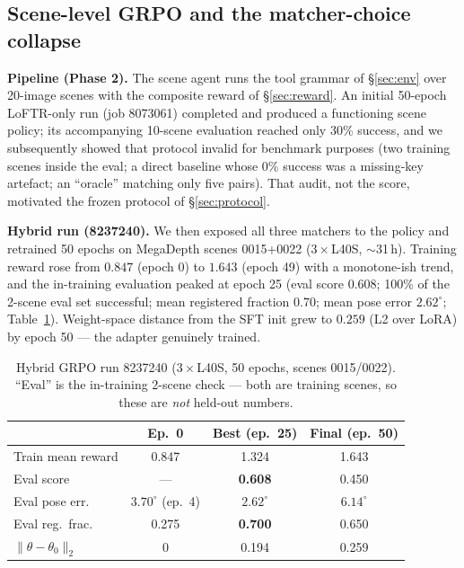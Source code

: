 \documentclass[10pt,twocolumn,letterpaper]{article}
\begin{document}
\subsection{Scene-level GRPO and the matcher-choice collapse}
\label{sec:hybrid}

\textbf{Pipeline (Phase 2).} The scene agent runs the tool grammar of
\S\ref{sec:env} over 20-image scenes with the composite reward of
\S\ref{sec:reward}. An initial 50-epoch LoFTR-only run (job 8073061)
completed and produced a functioning scene policy; its accompanying
10-scene evaluation reached only 30\% success, and we subsequently showed
that protocol invalid for benchmark purposes (two training scenes inside
the eval; a direct baseline whose 0\% success was a missing-key artefact;
an ``oracle'' matching only five pairs). That audit, not the score,
motivated the frozen protocol of \S\ref{sec:protocol}.

\textbf{Hybrid run (8237240).} We then exposed all three matchers to the
policy and retrained 50 epochs on MegaDepth scenes 0015+0022
($3\times$L40S, $\sim$31\,h). Training reward rose from
$0.847$ (epoch 0) to $1.643$ (epoch 49) with a monotone-ish trend, and the
in-training evaluation peaked at epoch 25 (eval score 0.608; 100\% of the
2-scene eval set successful; mean registered fraction 0.70; mean pose
error $2.62^\circ$; Table~\ref{tab:hybrid}). Weight-space distance from
the SFT init grew to $0.259$ (L2 over LoRA) by epoch 50 — the adapter
genuinely trained.

\begin{table}[t]
\centering\small
\caption{Hybrid GRPO run 8237240 ($3\times$L40S, 50 epochs, scenes
0015/0022). ``Eval'' is the in-training 2-scene check — both are training
scenes, so these are \emph{not} held-out numbers.}
\label{tab:hybrid}
\begin{tabular}{lccc}
\toprule
 & Ep.\ 0 & Best (ep.\ 25) & Final (ep.\ 50) \\
\midrule
Train mean reward & 0.847 & 1.324 & 1.643 \\
Eval score & --- & \textbf{0.608} & 0.450 \\
Eval pose err.\ & $3.70^\circ$ (ep.\ 4) & $\mathbf{2.62^\circ}$ & $6.14^\circ$ \\
Eval reg.\ frac.\ & 0.275 & \textbf{0.700} & 0.650 \\
$\|\theta-\theta_0\|_2$ & 0 & 0.194 & 0.259 \\
\bottomrule
\end{tabular}
\end{table}
\end{document}
